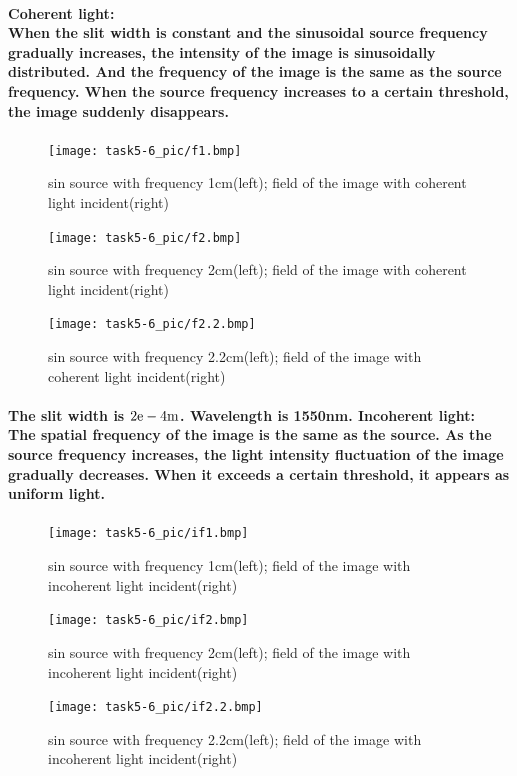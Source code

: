 \documentclass[fontsize=11pt]{scrartcl}
\begin{document}
\paragraph{\bf{Coherent light:} \\
When the slit width is constant and the sinusoidal source frequency gradually increases, 
the intensity of the image is sinusoidally distributed. 
And the frequency of the image is the same as the source frequency. 
When the source frequency increases to a certain threshold, the image suddenly disappears.}
\begin{figure}[t]
    \centering
    \texttt{[image: task5-6\_pic/f1.bmp]}
    \caption{sin source with frequency 1cm(left); field of the image with coherent light incident(right)}
    \label{ocp}
\end{figure}
\begin{figure}[t]
    \centering
    \texttt{[image: task5-6\_pic/f2.bmp]}
    \caption{sin source with frequency 2cm(left); field of the image with coherent light incident(right)}
    \label{ocp}
\end{figure}
\begin{figure}[t]
    \centering
    \texttt{[image: task5-6\_pic/f2.2.bmp]}
    \caption{sin source with frequency 2.2cm(left); field of the image with coherent light incident(right)}
    \label{ocp}
\end{figure}
\paragraph{The slit width is $2\rm e-4 m$. Wavelength is 1550nm.
    \bf{
    Incoherent light:} \\
The spatial frequency of the image is the same as the source. 
As the source frequency increases, the light intensity fluctuation 
of the image gradually decreases. When it exceeds a certain threshold, 
it appears as uniform light.}
\begin{figure}[t]
    \centering
    \texttt{[image: task5-6\_pic/if1.bmp]}
    \caption{sin source with frequency 1cm(left); field of the image with incoherent light incident(right)}
    \label{ocp}
\end{figure}
\begin{figure}[t]
    \centering
    \texttt{[image: task5-6\_pic/if2.bmp]}
    \caption{sin source with frequency 2cm(left); field of the image with incoherent light incident(right)}
    \label{ocp}
\end{figure}
\begin{figure}[t]
    \centering
    \texttt{[image: task5-6\_pic/if2.2.bmp]}
    \caption{sin source with frequency 2.2cm(left); field of the image with incoherent light incident(right)}
    \label{ocp}
\end{figure}
\end{document}
